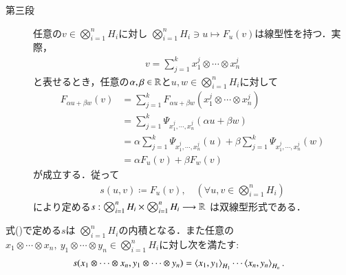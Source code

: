 \begin{description}
		\item[第三段]
			任意の$v \in \bigotimes_{i=1}^n H_i$に対し
			$\bigotimes_{i=1}^n H_i \ni u \longmapsto F_u(v)$は線型性を持つ．実際，
			\begin{align}
				v = \sum_{j=1}^k x^j_1 \otimes \cdots \otimes x^j_n
			\end{align}
			と表せるとき，任意の$\alpha,\beta \in \mathbb{R}$と$u,w \in \bigotimes_{i=1}^n H_i$に対して
			\begin{align}
				F_{\alpha u + \beta w}(v)
				&= \sum_{j=1}^k F_{\alpha u + \beta w}(x^j_1 \otimes \cdots \otimes x^j_n) \\
				&= \sum_{j=1}^k \Psi_{x^j_1, \cdots, x^j_n}(\alpha u + \beta w) \\
				&= \alpha \sum_{j=1}^k \Psi_{x^j_1, \cdots, x^j_n}(u)
					+ \beta \sum_{j=1}^k \Psi_{x^j_1, \cdots, x^j_n}(w) \\
				&= \alpha F_{u}(v) + \beta F_{w}(v)
			\end{align}
			が成立する．従って
			\begin{align}
				s(u,v) \coloneqq F_u(v),
				\quad (\forall u,v \in \bigotimes_{i=1}^n H_i)
				\label{eq:def_inner_product_of_tensor_product}
			\end{align}
			により定める$s:\bigotimes_{i=1}^n H_i \times \bigotimes_{i=1}^n H_i \longrightarrow \mathbb{R}$
			は双線型形式である．
	\end{description}
	
	\begin{screen}
		\begin{thm}
			式()で定める$s$は
			$\bigotimes_{i=1}^n H_i$の内積となる．また任意の
			$x_1 \otimes \cdots \otimes x_n,\ y_1 \otimes \cdots \otimes y_n 
			\in \bigotimes_{i=1}^n H_i$に対し次を満たす:
			\begin{align}
				s(x_1 \otimes \cdots \otimes x_n,y_1 \otimes \cdots \otimes y_n)
				= \inprod<x_1,y_1>_{H_1} \cdots \inprod<x_n,y_n>_{H_n}.
			\end{align}
		\end{thm}
	\end{screen}
	
